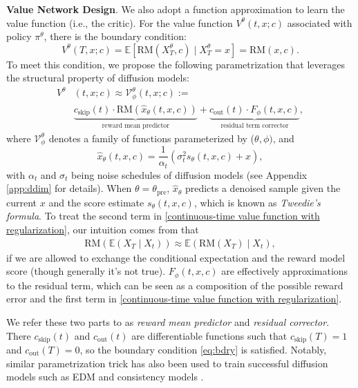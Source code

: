\documentclass{article}
\theoremstyle{plain}
\theoremstyle{definition}
\theoremstyle{remark}
\begin{document}
\textbf{Value Network Design}. 
We also adopt a function approximation to learn the value function (i.e., the critic). 
For the value function $V^{\theta}(t,x;c)$ associated with policy $\pi^{\theta}$, 
there is the boundary condition:
\begin{equation}
\label{eq:bdry}
V^\theta(T,x;c)=\mathbb{E} \left[\text{RM}(X^{\theta}_T,c)\mid X^{\theta}_T=x\right] = \text{RM}(x,c). 
\end{equation}
To meet this condition, we propose the following parametrization that leverages the structural property of diffusion models:
\begin{align}
V^\theta&(t,x;c)\approx \mathcal{V}^{\theta}_{\phi}(t,x;c) :=\nonumber\\ 
&\underbrace{c_{\text{skip}}(t)\cdot \text{RM}(\hat{x}_{\theta}(t,x,c))}_{\text{reward mean predictor}} + \underbrace{c_{\text{out}}(t)\cdot F_{\phi}(t,x, c)}_{\text{residual term corrector}},
\end{align}
where $\mathcal{V}^{\theta}_{\phi}$ denotes a family of functions parameterized by ($\theta, \phi)$, and 
\begin{equation}
\label{Denoised sample predict}
\hat{x}_{\theta}(t,x,c) = \frac{1}{\alpha_t}\left(\sigma^2_t s_{\theta}(t,x,c) + x\right),
\end{equation}
with $\alpha_t$ and $\sigma_t$ being noise schedules of diffusion models 
(see Appendix \ref{app:ddim} for details). 
When $\theta=\theta_{\text{pre}}$, $\hat{x}_{\theta}$ predicts a denoised sample given the current $x$ and the score estimate $s_{\theta}(t,x,c)$,
which is known as {\em Tweedie's formula}. 
To treat the second term in \eqref{continuous-time value function with regularization},
our intuition comes from that 
\begin{align}
\text{RM}(\mathbb{E}(X_T\mid X_t))\approx \mathbb{E}(\text{RM}(X_T)\mid X_t),
\end{align}
if we are allowed to exchange the conditional expectation and the reward model score (though generally it's not true).
$F_{\phi}(t,x,c)$ are effectively approximations to the residual term,
which can be seen as a composition of the possible reward error and the 
first term in \eqref{continuous-time value function with regularization}. 

We refer these two parts to as {\it reward mean predictor} and {\it residual corrector}. 
There $c_{\text{skip}}(t)$ and $c_{\text{out}}(t)$ are differentiable functions such that $c_{\text{skip}}(T)=1$ and $c_{\text{out}}(T)=0$, so the boundary condition \eqref{eq:bdry} is satisfied. 
Notably, similar parametrization trick has also been used to train successful diffusion models such as
EDM \cite{karras2022elucidating} and consistency models \cite{song2023consistency}.
\end{document}
